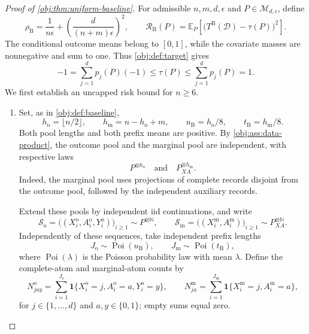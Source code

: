 \documentclass[11pt]{article}
\begin{document}
\begin{proof}[Proof of \cref{obj:thm:uniform-baseline}]
For admissible \(n,m,d,\epsilon\) and \(P\in\mathcal M_{d,\epsilon}\), define
\[
\rho_{\mathrm B}
=
\frac{1}{n\epsilon}
+
\left(\frac{d}{(n+m)\epsilon}\right)^2,
\qquad
\mathcal R_{\mathrm B}(P)
=
\mathbb E_P\!\left[
\bigl(T^{\mathrm B}(\mathcal D)-\tau(P)\bigr)^2
\right].
\]
The conditional outcome means belong to \([0,1]\), while the covariate masses are nonnegative and sum to one. Thus \cref{obj:def:target} gives
\[
-1
=
\sum_{j=1}^d p_j(P)(-1)
\le \tau(P)
\le
\sum_{j=1}^d p_j(P)
=
1.
\]
We first establish an uncapped risk bound for \(n\ge6\).

\begin{enumerate}
\item
Set, as in \cref{obj:def:baseline},
\[
h_{\mathrm o}=\lfloor n/2\rfloor,
\qquad
h_{\mathrm m}=n-h_{\mathrm o}+m,
\qquad
u_{\mathrm B}=h_{\mathrm o}/8,
\qquad
t_{\mathrm B}=h_{\mathrm m}/8.
\]
Both pool lengths and both prefix means are positive. By
\cref{obj:ass:data-product}, the outcome pool and the marginal pool are independent, with respective laws
\[
P^{\otimes h_{\mathrm o}}
\quad\text{and}\quad
P_{XA}^{\otimes h_{\mathrm m}}.
\]
Indeed, the marginal pool uses projections of complete records disjoint from the outcome pool, followed by the independent auxiliary records.

Extend these pools by independent iid continuations, and write
\[
\mathcal S_{\mathrm o}
=
\bigl((X_i^{\mathrm o},A_i^{\mathrm o},Y_i^{\mathrm o})\bigr)_{i\ge1}
\sim P^{\otimes\mathbb N},
\qquad
\mathcal S_{\mathrm m}
=
\bigl((X_i^{\mathrm m},A_i^{\mathrm m})\bigr)_{i\ge1}
\sim P_{XA}^{\otimes\mathbb N}.
\]
Independently of these sequences, take independent prefix lengths
\[
J_{\mathrm o}\sim\operatorname{Poi}(u_{\mathrm B}),
\qquad
J_{\mathrm m}\sim\operatorname{Poi}(t_{\mathrm B}),
\]
where \(\operatorname{Poi}(\lambda)\) is the Poisson probability law with mean \(\lambda\). Define the complete-atom and marginal-atom counts by
\[
N_{jay}^{\mathrm o}
=
\sum_{i=1}^{J_{\mathrm o}}
\mathbf1\{X_i^{\mathrm o}=j,A_i^{\mathrm o}=a,Y_i^{\mathrm o}=y\},
\qquad
N_{ja}^{\mathrm m}
=
\sum_{i=1}^{J_{\mathrm m}}
\mathbf1\{X_i^{\mathrm m}=j,A_i^{\mathrm m}=a\},
\]
for \(j\in\{1,\ldots,d\}\) and \(a,y\in\{0,1\}\); empty sums equal zero.


\end{enumerate}
\end{proof}
\end{document}
